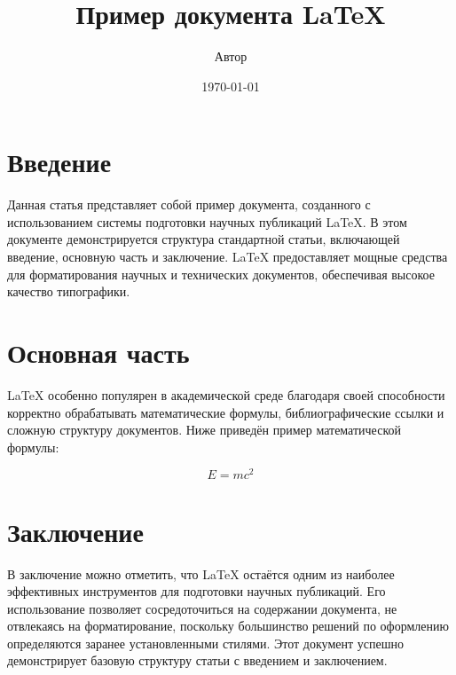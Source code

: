 \documentclass[12pt]{article}
\title{Пример документа LaTeX}
\author{Автор}
\date{\today}
\begin{document}
\maketitle

\section{Введение}
Данная статья представляет собой пример документа, созданного с использованием системы подготовки научных публикаций LaTeX. В этом документе демонстрируется структура стандартной статьи, включающей введение, основную часть и заключение. LaTeX предоставляет мощные средства для форматирования научных и технических документов, обеспечивая высокое качество типографики.

\section{Основная часть}
LaTeX особенно популярен в академической среде благодаря своей способности корректно обрабатывать математические формулы, библиографические ссылки и сложную структуру документов. Ниже приведён пример математической формулы:

\begin{equation}
    E = mc^2
\end{equation}

\section{Заключение}
В заключение можно отметить, что LaTeX остаётся одним из наиболее эффективных инструментов для подготовки научных публикаций. Его использование позволяет сосредоточиться на содержании документа, не отвлекаясь на форматирование, поскольку большинство решений по оформлению определяются заранее установленными стилями. Этот документ успешно демонстрирует базовую структуру статьи с введением и заключением.
\end{document}
